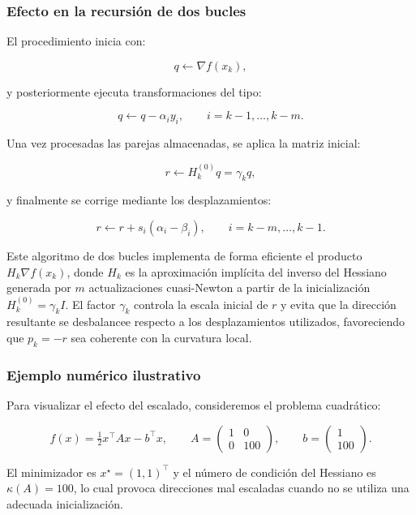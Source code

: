\documentclass[
  spanish,
  us-letterpaper,
]{scrreprt}
\numberwithin{equation}{section}
\begin{document}
\subsubsection{Efecto en la recursión de dos
bucles}\label{efecto-en-la-recursiuxf3n-de-dos-bucles}

El procedimiento inicia con:

\[
q \gets \nabla f(x_k),
\]

y posteriormente ejecuta transformaciones del tipo:

\[
q \gets q - \alpha_i y_i,
\qquad i = k-1,\dots,k-m.
\]

Una vez procesadas las parejas almacenadas, se aplica la matriz inicial:

\[
r \gets H_k^{(0)} q = \gamma_k q,
\]

y finalmente se corrige mediante los desplazamientos:

\[
r \gets r + s_i(\alpha_i - \beta_i),
\qquad i = k-m,\dots,k-1.
\]

Este algoritmo de dos bucles implementa de forma eficiente el producto
\(H_k \nabla f(x_k)\), donde \(H_k\) es la aproximación implícita del
inverso del Hessiano generada por \(m\) actualizaciones cuasi-Newton a
partir de la inicialización \(H_k^{(0)} = \gamma_k I\). El factor
\(\gamma_k\) controla la escala inicial de \(r\) y evita que la
dirección resultante se desbalancee respecto a los desplazamientos
utilizados, favoreciendo que \(p_k = -r\) sea coherente con la curvatura
local.

\subsubsection{Ejemplo numérico
ilustrativo}\label{ejemplo-numuxe9rico-ilustrativo-1}

Para visualizar el efecto del escalado, consideremos el problema
cuadrático:

\[
f(x) = \tfrac{1}{2} x^\top A x - b^\top x,
\qquad
A=
\begin{pmatrix}
1 & 0\\
0 & 100
\end{pmatrix},
\qquad
b=
\begin{pmatrix}
1\\
100
\end{pmatrix}.
\]

El minimizador es \(x^\star = (1,1)^\top\) y el número de condición del
Hessiano es \(\kappa(A) = 100\), lo cual provoca direcciones mal
escaladas cuando no se utiliza una adecuada inicialización.
\end{document}
